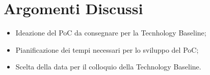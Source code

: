 \section{Argomenti Discussi}
	\begin{itemize}
		\item Ideazione del PoC da consegnare per la Tecnhology Baseline;
		\item Pianificazione dei tempi necessari per lo sviluppo del PoC;
		\item Scelta della data per il colloquio della Technology Baseline.
	\end{itemize}